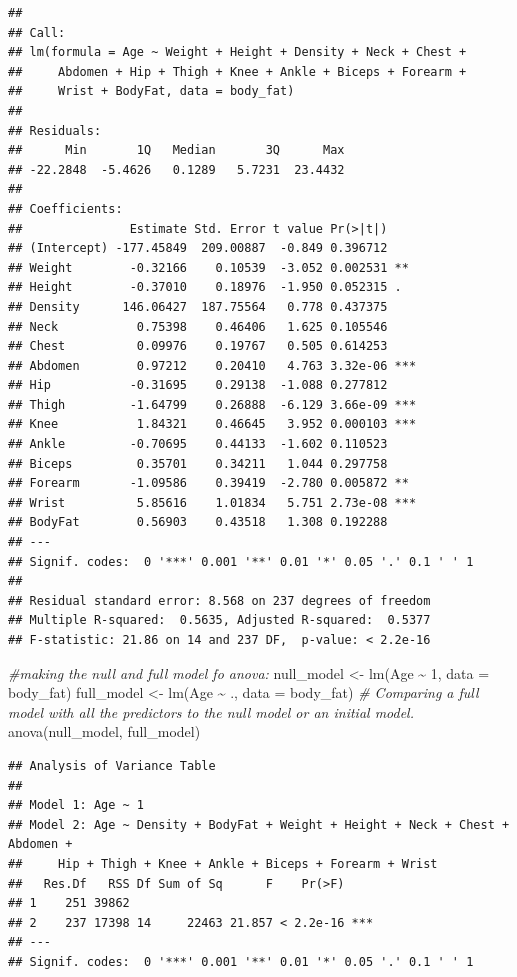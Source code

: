 \documentclass[
]{article}
\newenvironment{Shaded}{\begin{snugshade}}{\end{snugshade}}
\newcommand{\AttributeTok}[1]{\textcolor[rgb]{0.77,0.63,0.00}{#1}}
\newcommand{\CommentTok}[1]{\textcolor[rgb]{0.56,0.35,0.01}{\textit{#1}}}
\newcommand{\DecValTok}[1]{\textcolor[rgb]{0.00,0.00,0.81}{#1}}
\newcommand{\FunctionTok}[1]{\textcolor[rgb]{0.00,0.00,0.00}{#1}}
\newcommand{\NormalTok}[1]{#1}
\newcommand{\OtherTok}[1]{\textcolor[rgb]{0.56,0.35,0.01}{#1}}
\newcommand{\SpecialCharTok}[1]{\textcolor[rgb]{0.00,0.00,0.00}{#1}}
\begin{document}
\begin{verbatim}
## 
## Call:
## lm(formula = Age ~ Weight + Height + Density + Neck + Chest + 
##     Abdomen + Hip + Thigh + Knee + Ankle + Biceps + Forearm + 
##     Wrist + BodyFat, data = body_fat)
## 
## Residuals:
##      Min       1Q   Median       3Q      Max 
## -22.2848  -5.4626   0.1289   5.7231  23.4432 
## 
## Coefficients:
##               Estimate Std. Error t value Pr(>|t|)    
## (Intercept) -177.45849  209.00887  -0.849 0.396712    
## Weight        -0.32166    0.10539  -3.052 0.002531 ** 
## Height        -0.37010    0.18976  -1.950 0.052315 .  
## Density      146.06427  187.75564   0.778 0.437375    
## Neck           0.75398    0.46406   1.625 0.105546    
## Chest          0.09976    0.19767   0.505 0.614253    
## Abdomen        0.97212    0.20410   4.763 3.32e-06 ***
## Hip           -0.31695    0.29138  -1.088 0.277812    
## Thigh         -1.64799    0.26888  -6.129 3.66e-09 ***
## Knee           1.84321    0.46645   3.952 0.000103 ***
## Ankle         -0.70695    0.44133  -1.602 0.110523    
## Biceps         0.35701    0.34211   1.044 0.297758    
## Forearm       -1.09586    0.39419  -2.780 0.005872 ** 
## Wrist          5.85616    1.01834   5.751 2.73e-08 ***
## BodyFat        0.56903    0.43518   1.308 0.192288    
## ---
## Signif. codes:  0 '***' 0.001 '**' 0.01 '*' 0.05 '.' 0.1 ' ' 1
## 
## Residual standard error: 8.568 on 237 degrees of freedom
## Multiple R-squared:  0.5635, Adjusted R-squared:  0.5377 
## F-statistic: 21.86 on 14 and 237 DF,  p-value: < 2.2e-16
\end{verbatim}

\begin{Shaded}
\begin{Highlighting}[]
\CommentTok{\#making the null and full model fo anova:}
\NormalTok{null\_model }\OtherTok{\textless{}{-}} \FunctionTok{lm}\NormalTok{(Age }\SpecialCharTok{\textasciitilde{}} \DecValTok{1}\NormalTok{, }\AttributeTok{data =}\NormalTok{ body\_fat)}
\NormalTok{full\_model }\OtherTok{\textless{}{-}} \FunctionTok{lm}\NormalTok{(Age }\SpecialCharTok{\textasciitilde{}}\NormalTok{ ., }\AttributeTok{data =}\NormalTok{ body\_fat)}
\CommentTok{\# Comparing a full model with all the predictors to the null model or an initial model.}
\FunctionTok{anova}\NormalTok{(null\_model, full\_model)}
\end{Highlighting}
\end{Shaded}

\begin{verbatim}
## Analysis of Variance Table
## 
## Model 1: Age ~ 1
## Model 2: Age ~ Density + BodyFat + Weight + Height + Neck + Chest + Abdomen + 
##     Hip + Thigh + Knee + Ankle + Biceps + Forearm + Wrist
##   Res.Df   RSS Df Sum of Sq      F    Pr(>F)    
## 1    251 39862                                  
## 2    237 17398 14     22463 21.857 < 2.2e-16 ***
## ---
## Signif. codes:  0 '***' 0.001 '**' 0.01 '*' 0.05 '.' 0.1 ' ' 1
\end{verbatim}
\end{document}
